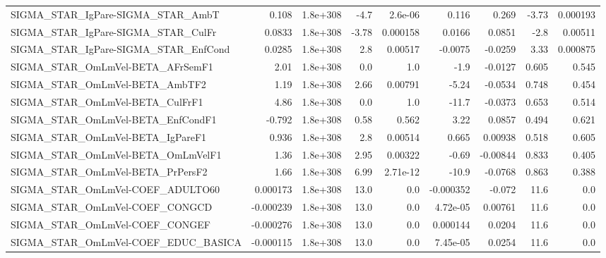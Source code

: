 \begin{tabular}{lrrrrrrrr}
SIGMA\_STAR\_IgPare-SIGMA\_STAR\_AmbT     &       0.108 &     1.8e+308 &    -4.7 &  2.6e-06 &      0.116 &       0.269 &        -3.73 &      0.000193 \\
SIGMA\_STAR\_IgPare-SIGMA\_STAR\_CulFr    &      0.0833 &     1.8e+308 &   -3.78 & 0.000158 &     0.0166 &      0.0851 &         -2.8 &       0.00511 \\
SIGMA\_STAR\_IgPare-SIGMA\_STAR\_EnfCond  &      0.0285 &     1.8e+308 &     2.8 &  0.00517 &    -0.0075 &     -0.0259 &         3.33 &      0.000875 \\
SIGMA\_STAR\_OmLmVel-BETA\_AFrSemF1      &        2.01 &     1.8e+308 &     0.0 &      1.0 &       -1.9 &     -0.0127 &        0.605 &         0.545 \\
SIGMA\_STAR\_OmLmVel-BETA\_AmbTF2        &        1.19 &     1.8e+308 &    2.66 &  0.00791 &      -5.24 &     -0.0534 &        0.748 &         0.454 \\
SIGMA\_STAR\_OmLmVel-BETA\_CulFrF1       &        4.86 &     1.8e+308 &     0.0 &      1.0 &      -11.7 &     -0.0373 &        0.653 &         0.514 \\
SIGMA\_STAR\_OmLmVel-BETA\_EnfCondF1     &      -0.792 &     1.8e+308 &    0.58 &    0.562 &       3.22 &      0.0857 &        0.494 &         0.621 \\
SIGMA\_STAR\_OmLmVel-BETA\_IgPareF1      &       0.936 &     1.8e+308 &     2.8 &  0.00514 &      0.665 &     0.00938 &        0.518 &         0.605 \\
SIGMA\_STAR\_OmLmVel-BETA\_OmLmVelF1     &        1.36 &     1.8e+308 &    2.95 &  0.00322 &      -0.69 &    -0.00844 &        0.833 &         0.405 \\
SIGMA\_STAR\_OmLmVel-BETA\_PrPersF2      &        1.66 &     1.8e+308 &    6.99 & 2.71e-12 &      -10.9 &     -0.0768 &        0.863 &         0.388 \\
SIGMA\_STAR\_OmLmVel-COEF\_ADULTO60      &    0.000173 &     1.8e+308 &    13.0 &      0.0 &  -0.000352 &      -0.072 &         11.6 &           0.0 \\
SIGMA\_STAR\_OmLmVel-COEF\_CONGCD        &   -0.000239 &     1.8e+308 &    13.0 &      0.0 &   4.72e-05 &     0.00761 &         11.6 &           0.0 \\
SIGMA\_STAR\_OmLmVel-COEF\_CONGEF        &   -0.000276 &     1.8e+308 &    13.0 &      0.0 &   0.000144 &      0.0204 &         11.6 &           0.0 \\
SIGMA\_STAR\_OmLmVel-COEF\_EDUC\_BASICA   &   -0.000115 &     1.8e+308 &    13.0 &      0.0 &   7.45e-05 &      0.0254 &         11.6 &           0.0 \\

\end{tabular}
